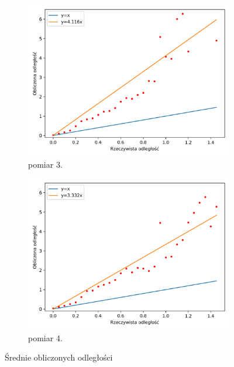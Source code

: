 \begin{figure}[H]
    \ContinuedFloat\centering
    \begin{subfigure}{0.5\textwidth}
        \centering
        \includegraphics[width=\textwidth]{pics/mic_sync_dist/dists_close_long_2_mean.png}
        \caption{pomiar 3.}
        \label{pic:slope_test_mean_2}
    \end{subfigure}%
    \begin{subfigure}{0.5\textwidth}
        \centering
        \includegraphics[width=\textwidth]{pics/mic_sync_dist/dists_close_long_3_mean.png}
        \caption{pomiar 4.}
        \label{pic:slope_test_mean_3}
    \end{subfigure}
    \caption{Średnie obliczonych odległości}
    \label{fig:slope_test_mean}
\end{figure}

